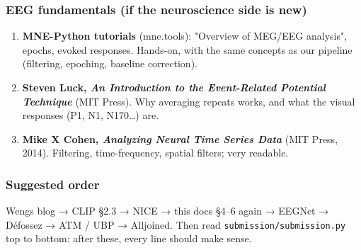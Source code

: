 \documentclass[
  11pt,
]{article}
\providecommand{\tightlist}{%
  \setlength{\itemsep}{0pt}\setlength{\parskip}{0pt}}
\renewcommand{\_}{\oldunderscore\allowbreak}
\begin{document}
\subsubsection{EEG fundamentals (if the
neuroscience side is
new)}\label{eeg-fundamentals-if-the-neuroscience-side-is-new}

\begin{enumerate}
\def\labelenumi{\arabic{enumi}.}
\setcounter{enumi}{15}
\tightlist
\item
  \textbf{MNE-Python tutorials}
  (mne.tools): "Overview of MEG/EEG
  analysis", epochs, evoked responses.
  Hands-on, with the same concepts as
  our pipeline (filtering, epoching,
  baseline correction).
\item
  \textbf{Steven Luck, \emph{An
  Introduction to the Event-Related
  Potential Technique}} (MIT Press). Why
  averaging repeats works, and what the
  visual responses (P1, N1, N170\ldots)
  are.
\item
  \textbf{Mike X Cohen, \emph{Analyzing
  Neural Time Series Data}} (MIT Press,
  2014). Filtering, time-frequency,
  spatial filters; very readable.
\end{enumerate}

\subsubsection{Suggested
order}\label{suggested-order}

Weng\textquotesingle s blog → CLIP §2.3
→ NICE → this doc\textquotesingle s
§4--6 again → EEGNet → Défossez → ATM /
UBP → Alljoined. Then read
\texttt{submission/submission.py} top to
bottom: after these, every line should
make sense.
\end{document}
